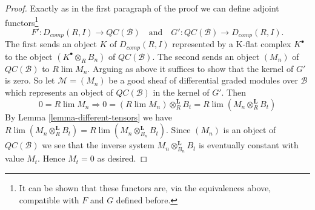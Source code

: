 \documentclass[10pt,a4paper]{amsart}
\theoremstyle{plain}
\theoremstyle{definition}
\theoremstyle{remark}
\numberwithin{equation}{subsection}
\def\lim{\mathop{\mathrm{lim}}\nolimits}
\begin{document}
\begin{proof}
\medskip\noindent
Exactly as in the first paragraph of the proof we can define
adjoint functors\footnote{It can be shown that these functors are,
via the equivalences above, compatible with $F$ and $G$ defined before.}
$$
F' : D_{comp}(R, I) \longrightarrow \mathit{QC}(\mathcal{B})
\quad\text{and}\quad
G' : \mathit{QC}(\mathcal{B}) \longrightarrow D_{comp}(R, I).
$$
The first sends an object $K$ of $D_{comp}(R, I)$ represented by a
K-flat complex $K^\bullet$ to the object $(K^\bullet \otimes_R B_n)$
of $\mathit{QC}(\mathcal{B})$. The second sends an object
$(M_n)$ of $\mathit{QC}(\mathcal{B})$ to $R\lim M_n$.
Arguing as above it suffices to show that the kernel of $G'$ is zero.
So let $\mathcal{M} = (M_n)$ be a good sheaf of differential graded
modules over $\mathcal{B}$ which represents an object of
$\mathit{QC}(\mathcal{B})$ in the kernel of $G'$. Then
$$
0 = R\lim M_n \Rightarrow
0 = (R\lim M_n) \otimes_R^\mathbf{L} B_t =
R\lim (M_n \otimes_R^\mathbf{L} B_t)
$$
By Lemma \ref{lemma-different-tensors} we have
$R\lim (M_n \otimes_R^\mathbf{L} B_t) =
R\lim (M_n \otimes_{B_n}^\mathbf{L} B_t)$.
Since $(M_n)$ is an object of $\mathit{QC}(\mathcal{B})$ we
see that the inverse system $M_n \otimes_{B_n}^\mathbf{L} B_t$
is eventually constant with value $M_t$. Hence $M_t = 0$ as desired.
\end{proof}
\end{document}
